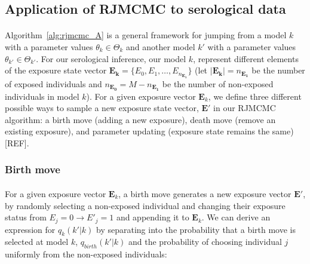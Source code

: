 \documentclass{article}
\begin{document}





\subsection{Application of RJMCMC to serological data}
\paragraph{}Algorithm~\ref{alg:rjmcmc_A} is a general framework for jumping from a model $k$ with a parameter values $\theta_k \in \Theta_k$ and another model $k'$ with a parameter values $\theta_{k'} \in \Theta_{k'}$. For our serological inference, our model $k$, represent different elements of the exposure state vector $\mathbf{E_k} = \{E_0, E_1, \dots, E_{n_\mathbf{E_1}}\}$ (let $|\mathbf{E_k}| = n_\mathbf{E_1}$ be the number of exposed individuals and $n_\mathbf{E_0} = M - n_\mathbf{E_1}$ be the number of non-exposed individuals in model $k$). For a given exposure vector $\mathbf{E}_k$, we define three different possible ways to sample a new exposure state vector, $\mathbf{E'}$ in our RJMCMC algorithm: a birth move (adding a new exposure), death move (remove an existing exposure), and parameter updating (exposure state remains the same)[REF]. 

\subsubsection{Birth move}

\paragraph{}For a given exposure vector $\mathbf{E}_k$, a birth move generates a new exposure vector $\mathbf{E'}$, by randomly selecting a non-exposed individual and changing their exposure status from $E_j = 0 \rightarrow E'_j = 1$ and appending it to $\mathbf{E}_k$. We can derive an expression for $q_k(k' | k)$ by separating into the probability that a birth move is selected at model $k$, $q_{birth}(k' |k)$ and the probability of choosing individual $j$ uniformly from the non-exposed individuals:
\end{document}
